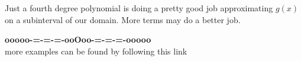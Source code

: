 \documentclass{ximera}
\begin{document}
\begin{center}
\end{center}


Just a fourth degree polynomial is doing a pretty good job approximating $g(x)$ on a subinterval of our domain.  More terms may do a better job.















































\begin{center}
\textbf{\textcolor{green!50!black}{ooooo-=-=-=-ooOoo-=-=-=-ooooo}} \\

more examples can be found by following this link\\ 

\end{center}
\end{document}
